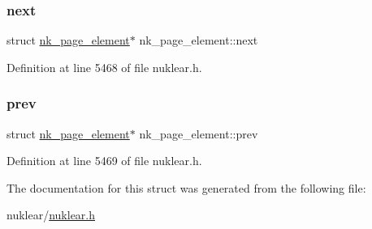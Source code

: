 \subsubsection{\texorpdfstring{next}{next}}
{\footnotesize\ttfamily struct \mbox{\hyperlink{structnk__page__element}{nk\+\_\+page\+\_\+element}}$\ast$ nk\+\_\+page\+\_\+element\+::next}



Definition at line 5468 of file nuklear.\+h.

\mbox{\label{structnk__page__element_a1254dabb77cb9a33240f007f473a99b2}} 
\subsubsection{\texorpdfstring{prev}{prev}}
{\footnotesize\ttfamily struct \mbox{\hyperlink{structnk__page__element}{nk\+\_\+page\+\_\+element}}$\ast$ nk\+\_\+page\+\_\+element\+::prev}



Definition at line 5469 of file nuklear.\+h.



The documentation for this struct was generated from the following file\+:\begin{DoxyCompactItemize}
\item 
nuklear/\mbox{\hyperlink{nuklear_8h}{nuklear.\+h}}\end{DoxyCompactItemize}
